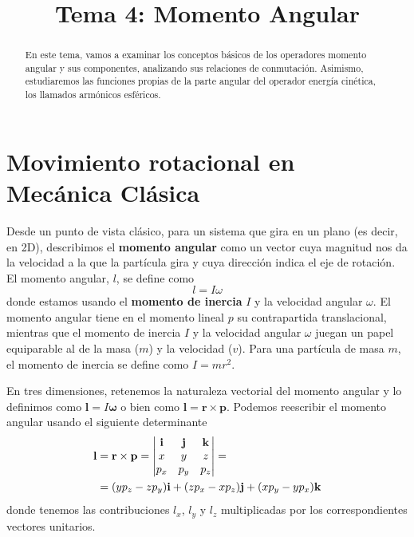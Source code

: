 \documentclass{tufte-handout}
\title[Química Física II: Tema 4 - Momento angular]{Tema 4: Momento Angular}
\date{}  %
\begin{document}
\maketitle%

\begin{abstract}
\noindent En este tema, vamos a examinar los conceptos básicos de los
operadores momento angular y sus componentes, analizando sus
relaciones de conmutación. Asimismo, estudiaremos las
funciones propias de la parte angular del operador 
energía cinética, los llamados armónicos esféricos.
\end{abstract}



\section{Movimiento rotacional en Mecánica Clásica}
Desde un punto de vista clásico, para un sistema que gira 
en un plano (es decir, en 2D), describimos el \textbf{momento
angular} como un vector cuya magnitud nos da la velocidad 
a la que la partícula gira y cuya dirección indica el eje
de rotación. El momento angular, $l$, se define como
\begin{equation}
    l=I\omega
\end{equation}
donde estamos usando el \textbf{momento de inercia} $I$ y
la velocidad angular $\omega$. El momento angular tiene 
en el momento lineal $p$ su contrapartida translacional, mientras que el momento de inercia $I$ y la velocidad
angular $\omega$ juegan un papel equiparable al de la masa
($m$) y la velocidad ($v$). Para una partícula de masa $m$, 
el momento de inercia se define como $I=mr^2$.


En tres dimensiones, retenemos la naturaleza vectorial
del momento angular y lo definimos como 
$\mathbf{l}= I\bm{\omega}$
o bien como $\mathbf{l} = \mathbf{r}\times\mathbf{p}$.
Podemos reescribir el momento angular usando el siguiente
determinante
\begin{align}
    \mathbf{l}&=\mathbf{r}\times\mathbf{p} =
    \begin{vmatrix}
\mathbf{i} & \mathbf{j} & \mathbf{k}  \\ 
x & y & z \\ 
p_x & p_y & p_z  \notag
\end{vmatrix} = \\
&= (yp_z-zp_y)\mathbf{i} +
(zp_x-xp_z)\mathbf{j} +
(xp_y-yp_x)\mathbf{k}
\end{align}
donde tenemos las contribuciones $l_x$, $l_y$ y $l_z$
multiplicadas por los correspondientes vectores unitarios.
\end{document}
